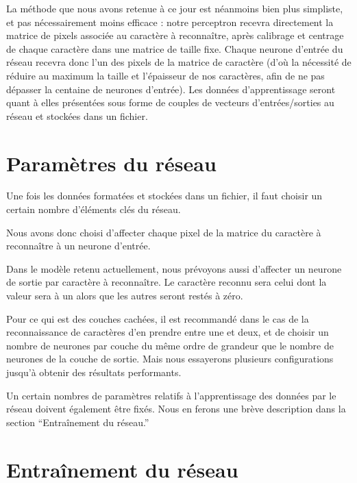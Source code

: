 \documentclass[a4paper,10pt]{report}
\begin{document}
La m\'ethode que nous avons retenue \`a ce jour est n\'eanmoins bien
plus simpliste, et pas n\'ecessairement moins efficace : notre
perceptron recevra directement la matrice de pixels associ\'ee au
caract\`ere \`a reconna\^itre, apr\`es calibrage et centrage de chaque
caract\`ere dans une matrice de taille fixe.
Chaque neurone d'entr\'ee du r\'eseau recevra donc l'un des pixels de la
matrice de caract\`ere (d'o\`u la n\'ecessit\'e de r\'eduire au maximum
la taille et l'\'epaisseur de nos caract\`eres, afin de ne pas
d\'epasser la centaine de neurones d'entr\'ee).
Les donn\'ees d'apprentissage seront quant \`a elles pr\'esent\'ees sous
forme de couples de vecteurs d'entr\'ees/sorties au r\'eseau et
stock\'ees dans un fichier.



\section{Param\`etres du r\'eseau} %
\label{subsec:choix_des_parametres_du_reseau}

Une fois les donn\'ees format\'ees et stock\'ees dans un fichier, il
faut choisir un certain nombre d'éléments clés du réseau.

Nous avons donc choisi d'affecter chaque pixel de la matrice du
caract\`ere \`a reconna\^itre \`a un neurone d'entr\'ee.

Dans le mod\`ele retenu actuellement, nous pr\'evoyons aussi d'affecter
un neurone de sortie par caract\`ere \`a reconna\^itre. Le caract\`ere
reconnu sera celui dont la valeur sera \`a un alors que les autres seront
rest\'es \`a z\'ero.

Pour ce qui est des couches cach\'ees, il est recommand\'e dans le cas
de la reconnaissance de caract\`eres d'en prendre entre une et deux, et
de choisir un nombre de neurones par couche du m\^eme ordre de grandeur
que le nombre de neurones de la couche de sortie. Mais nous essayerons
plusieurs configurations jusqu'\`a obtenir des r\'esultats
performants.

Un certain nombres de param\`etres relatifs \`a l'apprentissage des
donn\'ees par le r\'eseau doivent \'egalement \^etre fix\'es. Nous en
ferons une br\`eve description dans la section ``Entra\^inement du r\'eseau.''


\section{Entra\^inement du r\'eseau} %
\label{subsec:entrainement_du_reseau}
\end{document}
